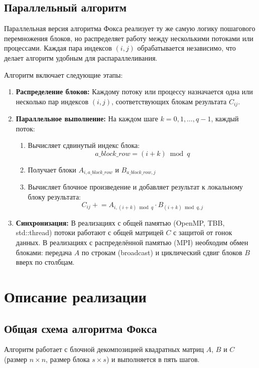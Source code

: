 \documentclass[12pt,a4paper]{extarticle}
\begin{document}
\subsection{Параллельный алгоритм}

Параллельная версия алгоритма Фокса реализует ту же самую логику пошагового перемножения блоков, но распределяет работу между несколькими потоками или процессами. Каждая пара индексов \( (i, j) \) обрабатывается независимо, что делает алгоритм удобным для распараллеливания.

Алгоритм включает следующие этапы:

\begin{enumerate}
	\item \textbf{Распределение блоков:}  
	Каждому потоку или процессу назначается одна или несколько пар индексов \( (i, j) \), соответствующих блокам результата \( C_{ij} \).
	
	\item \textbf{Параллельное выполнение:}  
	На каждом шаге \( k = 0, 1, \dots, q-1 \), каждый поток:
	
	\begin{enumerate}
		\item Вычисляет сдвинутый индекс блока:
		\[
		a\_block\_row = (i + k) \bmod q
		\]
		
		\item Получает блоки \( A_{i,a\_block\_row} \) и \( B_{a\_block\_row,j} \)
		
		\item Вычисляет блочное произведение и добавляет результат к локальному блоку результата:
		\[
		C_{ij} \mathrel{+}= A_{i,(i+k)\bmod q} \cdot B_{(i+k)\bmod q,j}
		\]
	\end{enumerate}
	
	\item \textbf{Синхронизация:}  
	В реализациях с общей памятью (OpenMP, TBB, std::thread) потоки работают с общей матрицей \( C \) с защитой от гонок данных.  
	В реализациях с распределённой памятью (MPI) необходим обмен блоками: передача \( A \) по строкам (broadcast) и циклический сдвиг блоков \( B \) вверх по столбцам.
\end{enumerate}
		
\newpage
\section{Описание реализации}
\subsection{Общая схема алгоритма Фокса}
Алгоритм работает с блочной декомпозицией квадратных матриц $A$, $B$ и $C$
(размер $n\times n$, размер блока $s\times s$) и выполняется в пять шагов.
\end{document}
